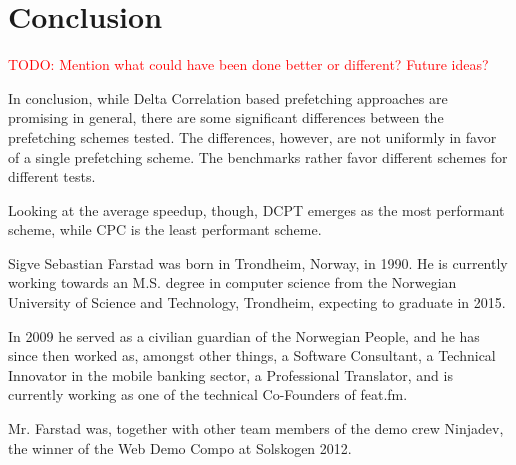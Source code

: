 \documentclass[a4paper]{IEEEtran}
\newcommand\TODO[1]{\textcolor{red}{TODO:#1}}
\newcommand\todo[1]{\TODO{#1}}
\begin{document}
\section{Conclusion}

\todo{ Mention what could have been done better or different? Future ideas? }

In conclusion, while Delta Correlation based prefetching approaches are promising in general, there are some significant differences between the prefetching schemes tested.
The differences, however, are not uniformly in favor of a single prefetching scheme.
The benchmarks rather favor different schemes for different tests.

Looking at the average speedup, though, DCPT emerges as the most performant scheme, while CPC is the least performant scheme.





\nocite{*}

\begin{IEEEbiography}{Sigve Sebastian Farstad}
    was born in Trondheim, Norway, in 1990.
    He is currently working towards an M.S. degree in computer science from the Norwegian University of Science and Technology, Trondheim, expecting to graduate in 2015.

    In 2009 he served as a civilian guardian of the Norwegian People, and he has since then worked as, amongst other things, a Software Consultant, a Technical Innovator in the mobile banking sector, a Professional Translator, and is currently working as one of the technical Co-Founders of feat.fm.

    Mr. Farstad was, together with other team members of the demo crew Ninjadev, the winner of the Web Demo Compo at Solskogen 2012.
\end{IEEEbiography}
\end{document}
